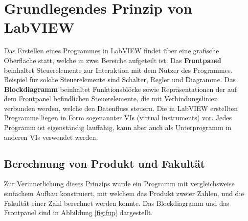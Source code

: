 \section{Grundlegendes Prinzip von LabVIEW}

Das Erstellen eines Programmes in LabVIEW findet über eine grafische Oberfläche statt, welche in zwei Bereiche aufgeteilt ist.
Das \textbf{Frontpanel} beinhaltet Steuerelemente zur Interaktion mit dem Nutzer des Programmes. Beispiel für solche Steuerelemente sind Schalter, Regler und Diagramme. Das \textbf{Blockdiagramm} beinhaltet Funktionsblöcke sowie Repräsentationen der auf dem Frontpanel befindlichen Steuerelemente, die mit Verbindungslinien verbunden werden, welche den Datenfluss steuern.
Die in LabVIEW erstellten Programme liegen in Form sogenannter VIs (virtual instruments) vor. Jedes Programm ist eigenständig lauffähig, kann aber auch als Unterprogramm in anderen VIs verwendet werden.

\subsection{Berechnung von Produkt und Fakultät}

Zur Verinnerlichung dieses Prinzips wurde ein Programm mit vergleichsweise einfachem Aufbau konstruiert, mit welchem das Produkt zweier Zahlen, und die Fakultät einer Zahl berechnet werden konnte. Das Blockdiagramm und das Frontpanel sind in Abbildung \ref{fig:fup} dargestellt.

\

